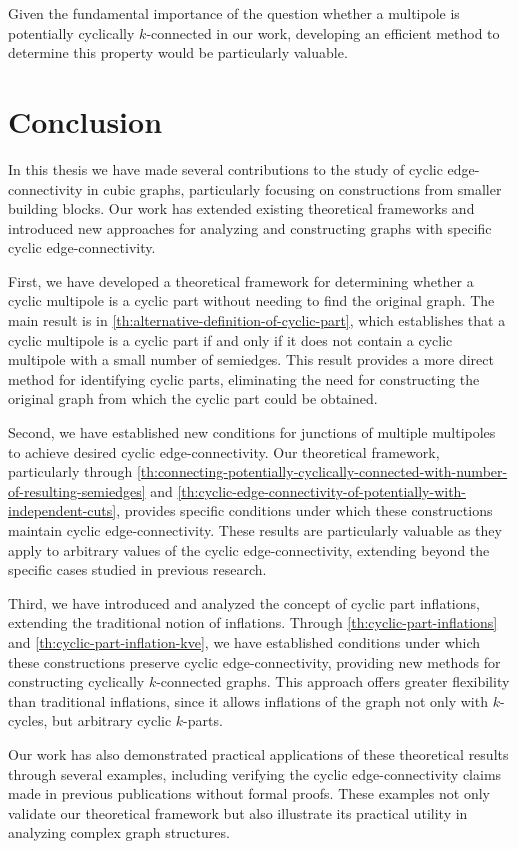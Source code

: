 \documentclass[12pt, twoside]{book}
\begin{document}
Given the fundamental importance of the question whether a multipole is potentially cyclically $k$-connected in our work, developing an efficient method to determine this property would be particularly valuable.

\chapter*{Conclusion}

In this thesis we have made several contributions to the study of cyclic edge-connectivity in cubic graphs, particularly focusing on constructions from smaller building blocks. Our work has extended existing theoretical frameworks and introduced new approaches for analyzing and constructing graphs with specific cyclic edge-connectivity.

First, we have developed a theoretical framework for determining whether a cyclic multipole is a cyclic part without needing to find the original graph. The main result is in \cref{th:alternative-definition-of-cyclic-part}, which establishes that a cyclic multipole is a cyclic part if and only if it does not contain a cyclic multipole with a small number of semiedges. This result provides a more direct method for identifying cyclic parts, eliminating the need for constructing the original graph from which the cyclic part could be obtained.

Second, we have established new conditions for junctions of multiple multipoles to achieve desired cyclic edge-connectivity. Our theoretical framework, particularly through \cref{th:connecting-potentially-cyclically-connected-with-number-of-resulting-semiedges} and \cref{th:cyclic-edge-connectivity-of-potentially-with-independent-cuts}, provides specific conditions under which these constructions maintain cyclic edge-connectivity. These results are particularly valuable as they apply to arbitrary values of the cyclic edge-connectivity, extending beyond the specific cases studied in previous research.

Third, we have introduced and analyzed the concept of cyclic part inflations, extending the traditional notion of inflations. Through \cref{th:cyclic-part-inflations} and \cref{th:cyclic-part-inflation-kve}, we have established conditions under which these constructions preserve cyclic edge-connectivity, providing new methods for constructing cyclically $k$-connected graphs. This approach offers greater flexibility than traditional inflations, since it allows inflations of the graph not only with $k$-cycles, but arbitrary cyclic $k$-parts.

Our work has also demonstrated practical applications of these theoretical results through several examples, including verifying the cyclic edge-connectivity claims made in previous publications without formal proofs. These examples not only validate our theoretical framework but also illustrate its practical utility in analyzing complex graph structures.

\newpage
\thispagestyle{empty}




\end{document}
